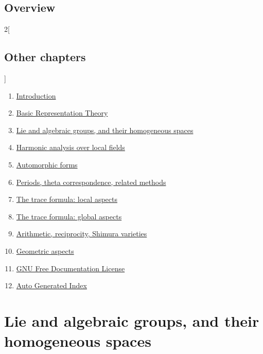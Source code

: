 \documentclass[oneside]{stacks-project-book}
\theoremstyle{plain}
\theoremstyle{definition}
\theoremstyle{remark}
\numberwithin{equation}{subsection}
\begin{document}
\section{Overview}
\label{representationtheory-section-overview}
\hypertarget{0101}{}
\reversemarginpar{}




\begin{multicols}{2}[\section{Other chapters}]
\noindent
\begin{enumerate}
\item \hyperref[introduction-section-phantom]{Introduction}
\item \hyperref[representationtheory-section-phantom]{Basic Representation Theory}
\item \hyperref[algebraicgroups-section-phantom]{Lie and algebraic groups, and their homogeneous spaces}
\item \hyperref[harmonicanalysis-section-phantom]{Harmonic analysis over local fields}
\item \hyperref[automorphicforms-section-phantom]{Automorphic forms}
\item \hyperref[periods-section-phantom]{Periods, theta correspondence, related methods}
\item \hyperref[traceformulalocal-section-phantom]{The trace formula: local aspects}
\item \hyperref[traceformulaglobal-section-phantom]{The trace formula: global aspects}
\item \hyperref[arithmetic-section-phantom]{Arithmetic, reciprocity, Shimura varieties}
\item \hyperref[geometric-section-phantom]{Geometric aspects}
\item \hyperref[fdl-section-phantom]{GNU Free Documentation License}
\item \hyperref[index-section-phantom]{Auto Generated Index}
\end{enumerate}
\end{multicols}

%

\chapter{Lie and algebraic groups, and their homogeneous spaces}
\end{document}
